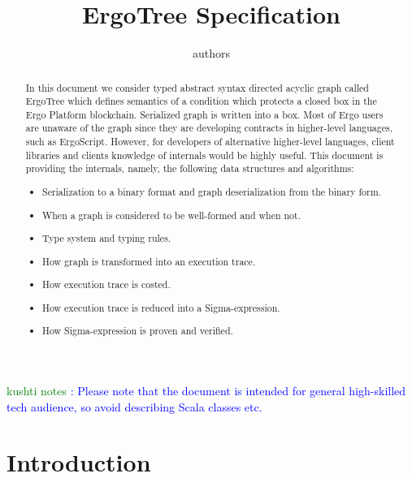 \documentclass[11pt]{article}
\newcommand{\authnote}[2]{\textsf{#1 \textcolor{blue}{: #2}}}
\newcommand{\knote}[1]{{\authnote{\textcolor{green}{kushti notes}}{#1}}}
\newcommand{\ASDag}{ErgoTree\xspace}
\begin{document}
\title{ErgoTree Specification}

\author{authors}


\maketitle

\begin{abstract}
In this document we consider typed abstract syntax directed acyclic graph
called \ASDag which defines semantics of a condition which protects a closed
box in the Ergo Platform blockchain. Serialized graph is written into a box.
Most of Ergo users are unaware of the graph since they are developing contracts in higher-level languages, such as
ErgoScript. However, for developers of alternative higher-level languages, client libraries and clients knowledge of
internals would be highly useful. This document is providing the internals, namely, the following data structures and
algorithms:
\begin{itemize}
\item{} Serialization to a binary format and graph deserialization from the binary form.
\item{} When a graph is considered to be well-formed and when not.
\item{} Type system and typing rules.
\item{} How graph is transformed into an execution trace.
\item{} How execution trace is costed.
\item{} How execution trace is reduced into a Sigma-expression.
\item{} How Sigma-expression is proven and verified.
\end{itemize}
\end{abstract}

\knote{Please note that the document is intended for general high-skilled tech audience, so avoid describing Scala
classes etc.}

\tableofcontents

\section{Introduction}
\label{sec:intro}

















\appendix





\end{document}
